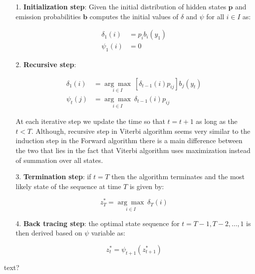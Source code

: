 \begin{itemize}
\item[1.] \textbf{Initialization step}: Given the initial distribution of hidden states $\textbf{p}$ and emission probabilities $\textbf{b}$ computes the initial values 
of $\delta$ and $\psi$ for all $i \in I$ as:

\begin{align}
\delta_1(i) &= p_i b_i(y_1)  \\
\psi_1(i)& = 0
\end{align}

\item[2.] \textbf{Recursive step}:

\begin{align}
\delta_1(i) &= \underset{i \in I}{\arg\max} \: [\delta_{t-1}(i)p_{ij}] b_j(y_t)  \\
\psi_t(j)& = \underset{i \in I}{\arg\max} \: \delta_{t-1}(i)p_{ij}
\end{align}

At each iterative step we update the time so that $t=t+1$ as long as the $t<T$. Although, recursive step in Viterbi algorithm seems very similar to the 
induction step in the Forward algorithm there is a main difference between the two that lies in the fact that Viterbi algorithm uses maximization instead of summation 
over all states. 

\item[3.] \textbf{Termination step}: if $t=T$ then the algorithm terminates and the most likely state of the sequence at time $T$ is given by:

\begin{equation}
z_T^* = \underset{i \in I}{\arg\max} \: \delta_{T}(i)
\end{equation}

\item[4.] \textbf{Back tracing step}: the optimal state sequence for $t = T-1,T-2,\ldots,1$ is then derived based on $\psi$ variable as:

\begin{equation}
z_t^* = \psi_{t+1}(z_{t+1}^*)
\end{equation}

\end{itemize}

text?

